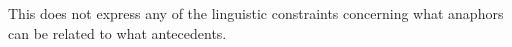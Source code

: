 
This does not express any of the linguistic constraints concerning
what anaphors can be related to what antecedents.  %
  
